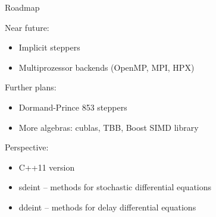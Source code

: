 \documentclass{beamer}
\newcommand{\heading}[1]{\centerline{\Large #1} \vspace{0.5em}}
\begin{document}
\begin{frame}
 \heading{Roadmap}

 \vspace{2ex}

Near future:
\begin{itemize}
\item Implicit steppers
\item Multiprozessor backends (OpenMP, MPI, HPX)
\end{itemize}

\vspace{2ex}
Further plans:
\begin{itemize}
 \item Dormand-Prince 853 steppers
 \item More algebras: cublas, TBB, Boost SIMD library
\end{itemize}

\vspace{2ex}                                                                                                       
Perspective:
\begin{itemize}
 \item C++11 version
 \item sdeint -- methods for stochastic differential equations
 \item ddeint -- methods for delay differential equations
\end{itemize}


\end{frame}
\end{document}

